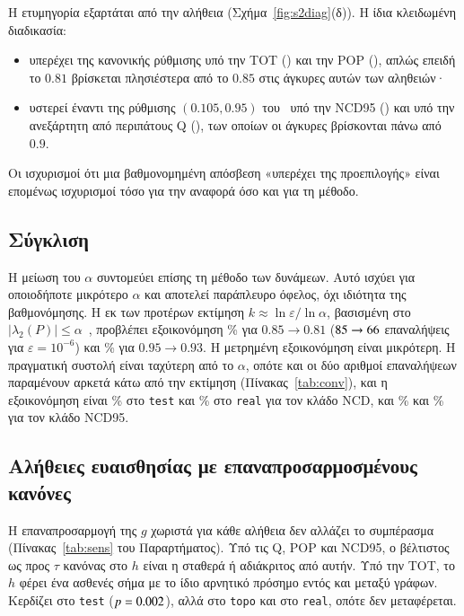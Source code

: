 \documentclass[11pt,a4paper]{article}
\theoremstyle{definition}
\theoremstyle{remark}
\begin{document}
Η ετυμηγορία εξαρτάται από την αλήθεια (Σχήμα~\ref{fig:s2diag}(δ)). Η ίδια κλειδωμένη διαδικασία:
\begin{itemize}[leftmargin=1.4em,itemsep=0pt]
\item υπερέχει της κανονικής ρύθμισης υπό την TOT (\PipeTotTwoVsLoTest) και την POP
(\PipePopTwoVsLoTest), απλώς επειδή το $0.81$ βρίσκεται πλησιέστερα από το $0.85$ στις άγκυρες αυτών
των αληθειών·
\item υστερεί έναντι της ρύθμισης $(0.105,0.95)$ του~\cite{ng13} υπό την NCD95 (\PipeNcdnfTwoVsHiTest)
και υπό την ανεξάρτητη από περιπάτους Q (\PipeQTwoVsHiTest), των οποίων οι άγκυρες βρίσκονται πάνω από
$0.9$.
\end{itemize}
Οι ισχυρισμοί ότι μια βαθμονομημένη απόσβεση «υπερέχει της προεπιλογής» είναι επομένως ισχυρισμοί τόσο
για την αναφορά όσο και για τη μέθοδο.



\subsection{Σύγκλιση}
Η μείωση του $\alpha$ συντομεύει επίσης τη μέθοδο των δυνάμεων. Αυτό ισχύει για οποιοδήποτε μικρότερο
$\alpha$ και αποτελεί παράπλευρο όφελος, όχι ιδιότητα της βαθμονόμησης. Η εκ των προτέρων εκτίμηση
$k\approx\ln\varepsilon/\ln\alpha$, βασισμένη στο $|\lambda_2(P)|\le\alpha$~\cite{haveliwala03,ng13},
προβλέπει εξοικονόμηση \ConvNcdBound\% για $0.85\to0.81$ ($85\to66$ επαναλήψεις για
$\varepsilon=10^{-6}$) και \ConvNfBound\% για $0.95\to0.93$. Η μετρημένη εξοικονόμηση είναι μικρότερη.
Η πραγματική συστολή είναι ταχύτερη από το $\alpha$, οπότε και οι δύο αριθμοί επαναλήψεων παραμένουν
αρκετά κάτω από την εκτίμηση (Πίνακας~\ref{tab:conv}), και η εξοικονόμηση είναι \ConvNcdTest\% στο
\texttt{test} και \ConvNcdReal\% στο \texttt{real} για τον κλάδο NCD, και \ConvNfTest\% και
\ConvNfReal\% για τον κλάδο NCD95.



\subsection{Αλήθειες ευαισθησίας με επαναπροσαρμοσμένους κανόνες}
Η επαναπροσαρμογή της $g$ χωριστά για κάθε αλήθεια δεν αλλάζει το συμπέρασμα
(Πίνακας~\ref{tab:sens} του Παραρτήματος). Υπό τις Q, POP και NCD95, ο βέλτιστος ως προς $\tau$ κανόνας
στο $h$ είναι η σταθερά ή αδιάκριτος από αυτήν. Υπό την TOT, το $h$ φέρει ένα ασθενές σήμα με το ίδιο
αρνητικό πρόσημο εντός και μεταξύ γράφων. Κερδίζει \TotHTest{} στο \texttt{test} ($p=0.002$),
αλλά \TotHTopo{} στο \texttt{topo} και \TotHReal{} στο \texttt{real}, οπότε δεν μεταφέρεται.
\end{document}
